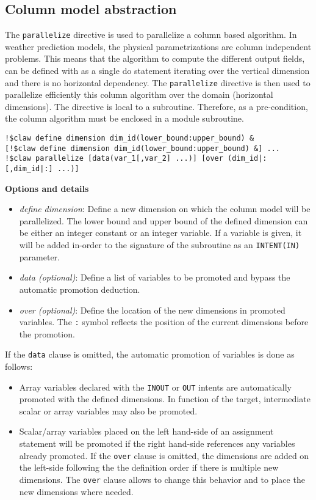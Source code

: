 \subsection{Column model abstraction}

The \lstinline!parallelize! directive is used to parallelize a column based
algorithm. In weather prediction models, the physical parametrizations are
column independent problems. This means that the algorithm to compute the
different output fields, can be defined with as a single do statement
iterating over the vertical dimension and there is no horizontal dependency.
The \lstinline!parallelize! directive is then used to parallelize efficiently
this column algorithm over the domain (horizontal dimensions).
The directive is local to a subroutine. Therefore, as a pre-condition, the
column algorithm must be enclosed in a module subroutine.

\begin{lstlisting}
!$claw define dimension dim_id(lower_bound:upper_bound) &
[!$claw define dimension dim_id(lower_bound:upper_bound) &] ...
!$claw parallelize [data(var_1[,var_2] ...)] [over (dim_id|:[,dim_id|:] ...)]
\end{lstlisting}

\textbf{Options and details}
\begin{itemize}
\item \textit{define dimension}: Define a new dimension on which the column
model will be parallelized. The lower bound and upper bound of the defined
dimension can be either an integer constant or an integer variable. If a
variable is given, it will be added in-order to the signature of the subroutine
as an \lstinline!INTENT(IN)! parameter.
\item \textit{data (optional)}: Define a list of variables to be promoted and
bypass the automatic promotion deduction.
\item \textit{over (optional)}: Define the location of the new dimensions in
promoted variables. The \lstinline!:! symbol reflects the position of the
current dimensions before the promotion.
\end{itemize}

If the \lstinline!data! clause is omitted, the automatic promotion of variables
is done as follows:
\begin{itemize}
\item Array variables declared with the \lstinline!INOUT! or \lstinline!OUT!
intents are automatically promoted with the defined dimensions.
In function of the target, intermediate scalar or array variables may also be
promoted.
\item Scalar/array variables placed on the left hand-side of an assignment
statement will be promoted if the right hand-side references any variables
already promoted. If the \lstinline!over! clause is omitted, the dimensions are
added on the left-side following the the definition order if there is multiple
new dimensions. The \lstinline!over! clause allows to change this behavior and
to place the new dimensions where needed.
\end{itemize}

